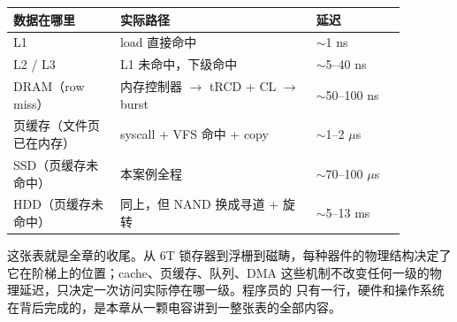 \begin{longtable}{L{0.24\linewidth}L{0.44\linewidth}L{0.20\linewidth}}
\toprule
数据在哪里 & 实际路径 & 延迟 \\
\midrule
L1 & load 直接命中 & $\sim$1 ns \\
L2 / L3 & L1 未命中，下级命中 & $\sim$5--40 ns \\
DRAM（row miss） & 内存控制器 $\to$ tRCD + CL $\to$ burst & $\sim$50--100 ns \\
页缓存（文件页已在内存） & syscall + VFS 命中 + copy & $\sim$1--2 $\mu$s \\
SSD（页缓存未命中） & 本案例全程 & $\sim$70--100 $\mu$s \\
HDD（页缓存未命中） & 同上，但 NAND 换成寻道 + 旋转 & $\sim$5--13 ms \\
\bottomrule
\end{longtable}

这张表就是全章的收尾。从 6T 锁存器到浮栅到磁畴，每种器件的物理结构决定了它在阶梯上的位置；cache、页缓存、队列、DMA 这些机制不改变任何一级的物理延迟，只决定一次访问实际停在哪一级。程序员的  只有一行，硬件和操作系统在背后完成的，是本章从一颗电容讲到一整张表的全部内容。

